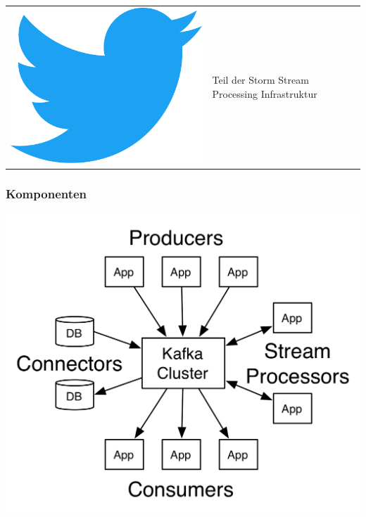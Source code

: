 \begin{frame}
\begin{tabular}{ l l }
	\includegraphics[scale=0.1]{figure/twitter_logo.pdf} & Teil der Storm Stream Processing Infrastruktur
\end{tabular}

\end{frame}

\begin{frame}
\frametitle{Komponenten}
	\centering
	\includegraphics[scale=1.5]{figure/kafka-apis.png}
\end{frame}

